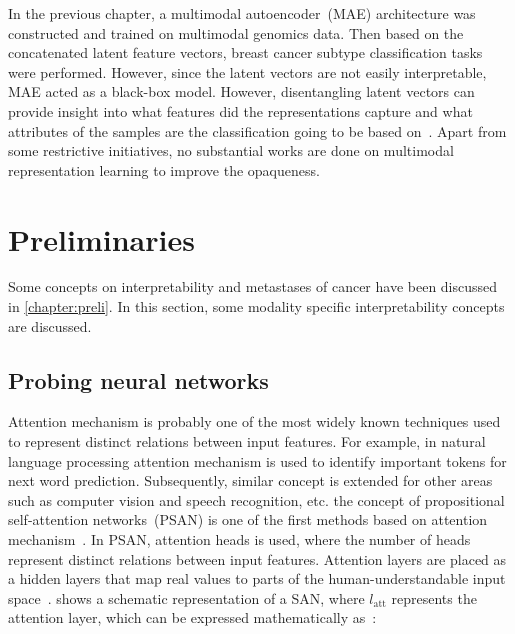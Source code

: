 \hspace*{3.5mm} In the previous chapter, a multimodal autoencoder~(MAE) architecture was constructed and trained on multimodal genomics data. Then based on the concatenated latent feature vectors, breast cancer subtype classification tasks were performed. However, since the latent vectors are not easily interpretable, MAE acted as a black-box model. However, disentangling latent vectors can provide insight into what features did the representations capture and what attributes of the samples are the classification going to be based on~\cite{karimTCBB2020}. 
Apart from some restrictive initiatives, no substantial works are done on multimodal representation learning to improve the opaqueness.

\section{Preliminaries}
Some concepts on interpretability and metastases of cancer have been discussed in \cref{chapter:preli}. In this section, some modality specific interpretability concepts are discussed.  


\subsection{Probing neural networks}
Attention mechanism is probably one of the most widely known techniques used to represent distinct relations between input features. For example, in natural language processing attention mechanism is used to identify important tokens for next word prediction. Subsequently, similar concept is extended for other areas such as computer vision and speech recognition, etc.%
the concept of propositional self-attention networks~(PSAN) is one of the first methods based on attention mechanism~\cite{vaswani2017attention}. In PSAN, attention heads is used, where the number of heads represent distinct relations between input features. Attention layers are placed as a hidden layers that map real values to parts of the human-understandable input space~\cite{vskrlj2020feature}. 
 shows a schematic representation of a SAN, where $l_{\text {att}}$ represents the attention layer, which can be expressed mathematically as~\cite{vskrlj2020feature}:  

